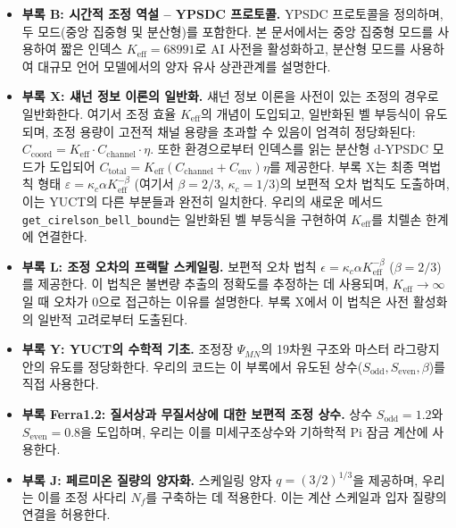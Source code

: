 \documentclass[11pt,a4paper]{article}
\begin{document}
	\begin{itemize}
		\item \textbf{부록 B: 시간적 조정 역설 – YPSDC 프로토콜.}  
		YPSDC 프로토콜을 정의하며, 두 모드(중앙 집중형 및 분산형)를 포함한다. 본 문서에서는 중앙 집중형 모드를 사용하여 짧은 인덱스 \(K_{\mathrm{eff}} = 68991\)로 AI 사전을 활성화하고, 분산형 모드를 사용하여 대규모 언어 모델에서의 양자 유사 상관관계를 설명한다.
		
		\item \textbf{부록 X: 섀넌 정보 이론의 일반화.}  
		섀넌 정보 이론을 사전이 있는 조정의 경우로 일반화한다. 여기서 조정 효율 \(K_{\mathrm{eff}}\)의 개념이 도입되고, 일반화된 벨 부등식이 유도되며, 조정 용량이 고전적 채널 용량을 초과할 수 있음이 엄격히 정당화된다: \(C_{\text{coord}} = K_{\mathrm{eff}} \cdot C_{\text{channel}} \cdot \eta\). 또한 환경으로부터 인덱스를 읽는 분산형 d‑YPSDC 모드가 도입되어 \(C_{\text{total}} = K_{\mathrm{eff}}(C_{\text{channel}} + C_{\text{env}})\eta\)를 제공한다. 부록 X는 최종 멱법칙 형태 \(\varepsilon = \kappa_c \alpha K_{\mathrm{eff}}^{-\beta}\) (여기서 \(\beta=2/3\), \(\kappa_c=1/3\))의 보편적 오차 법칙도 도출하며, 이는 YUCT의 다른 부분들과 완전히 일치한다. 우리의 새로운 메서드 \texttt{get\_cirelson\_bell\_bound}는 일반화된 벨 부등식을 구현하여 \(K_{\mathrm{eff}}\)를 치렐손 한계에 연결한다.
		
		\item \textbf{부록 L: 조정 오차의 프랙탈 스케일링.}  
		보편적 오차 법칙 \(\epsilon = \kappa_c \alpha K_{\mathrm{eff}}^{-\beta}\) (\(\beta = 2/3\))를 제공한다. 이 법칙은 불변량 추출의 정확도를 추정하는 데 사용되며, \(K_{\mathrm{eff}} \to \infty\)일 때 오차가 0으로 접근하는 이유를 설명한다. 부록 X에서 이 법칙은 사전 활성화의 일반적 고려로부터 도출된다.
		
		\item \textbf{부록 Y: YUCT의 수학적 기초.}  
		조정장 \(\Psi_{MN}\)의 19차원 구조와 마스터 라그랑지안의 유도를 정당화한다. 우리의 코드는 이 부록에서 유도된 상수(\(S_{\mathrm{odd}}, S_{\mathrm{even}}, \beta\))를 직접 사용한다.
		
		\item \textbf{부록 Ferra1.2: 질서상과 무질서상에 대한 보편적 조정 상수.}  
		상수 \(S_{\mathrm{odd}} = 1.2\)와 \(S_{\mathrm{even}} = 0.8\)을 도입하며, 우리는 이를 미세구조상수와 기하학적 Pi 잠금 계산에 사용한다.
		
		\item \textbf{부록 J: 페르미온 질량의 양자화.}  
		스케일링 양자 \(q = (3/2)^{1/3}\)을 제공하며, 우리는 이를 조정 사다리 \(N_f\)를 구축하는 데 적용한다. 이는 계산 스케일과 입자 질량의 연결을 허용한다.
		

\end{itemize}
\end{document}
